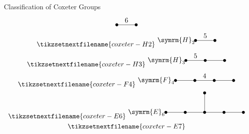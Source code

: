 \documentclass[fleqn]{NotesClass}
\newcommand{\dynkin}[2]{\symrm{#1}_{#2}}
\begin{document}
\begin{thm}{Classification of Coxeter Groups}{}
\begin{gather}
\begin{tikzpicture}
                \fill (0, 0) circle [radius=0.075cm];
                \fill (1, 0) circle [radius=0.075cm];
                \draw (0, 0) -- (1, 0) node [midway, above] {\(6\)};
            \end{tikzpicture}
            \\
            \tikzsetnextfilename{coxeter-H2}
            \begin{tikzpicture}
                \node at (-1, 0) {\(\dynkin{H}{2}\)};
                \fill (0, 0) circle [radius=0.075cm];
                \fill (1, 0) circle [radius=0.075cm];
                \draw (0, 0) -- (1, 0) node [midway, above] {\(5\)};
            \end{tikzpicture}
            \\
            \tikzsetnextfilename{coxeter-H3}
            \begin{tikzpicture}
                \node at (-1, 0) {\(\dynkin{H}{3}\)};
                \fill (0, 0) circle [radius=0.075cm];
                \fill (1, 0) circle [radius=0.075cm];
                \fill (2, 0) circle [radius=0.075cm];
                \draw (0, 0) -- (2, 0) node [pos=0.25, above] {\(5\)};
            \end{tikzpicture}
            \\
            \tikzsetnextfilename{coxeter-F4}
            \begin{tikzpicture}
                \node at (-1, 0) {\(\dynkin{F}{4}\)};
                \fill (0, 0) circle [radius=0.075cm];
                \fill (1, 0) circle [radius=0.075cm];
                \fill (2, 0) circle [radius=0.075cm];
                \fill (3, 0) circle [radius=0.075cm];
                \draw (0, 0) -- ++ (3, 0) node [midway, above] {\(4\)};
            \end{tikzpicture}
            \\
            \tikzsetnextfilename{coxeter-E6}
            \begin{tikzpicture}
                \node at (-1, 0) {\(\dynkin{E}{6}\)};
                \fill (0, 0) circle [radius=0.075cm];
                \fill (1, 0) circle [radius=0.075cm];
                \fill (2, 0) circle [radius=0.075cm];
                \fill (3, 0) circle [radius=0.075cm];
                \fill (4, 0) circle [radius=0.075cm];
                \fill (2, 1) circle [radius=0.075cm];
                \draw (0, 0) -- (4, 0);
                \draw (2, 0) -- (2, 1);
            \end{tikzpicture}
            \\
            \tikzsetnextfilename{coxeter-E7}

\end{gather}
\end{thm}
\end{document}
